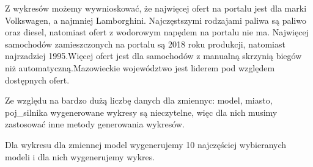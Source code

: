 \documentclass[
]{article}
\begin{document}
Z wykresów możemy wywnioskować, że najwięcej ofert na portalu jest dla
marki Volkswagen, a najmniej Lamborghini. Najczęstszymi rodzajami paliwa
są paliwo oraz diesel, natomiast ofert z wodorowym napędem na portalu
nie ma. Najwięcej samochodów zamieszczonych na portalu są 2018 roku
produkcji, natomiast najrzadziej 1995.Więcej ofert jest dla samochodów z
manualną skrzynią biegów niż automatyczną.Mazowieckie województwo jest
liderem pod względem dostępnych ofert.

Ze względu na bardzo dużą liczbę danych dla zmiennyc: model, miasto,
poj\_silnika wygenerowane wykresy są nieczytelne, więc dla nich musimy
zastosować inne metody generowania wykresów.

Dla wykresu dla zmiennej model wygenerujemy 10 najczęściej wybieranych
modeli i dla nich wygenerujemy wykres.
\end{document}
